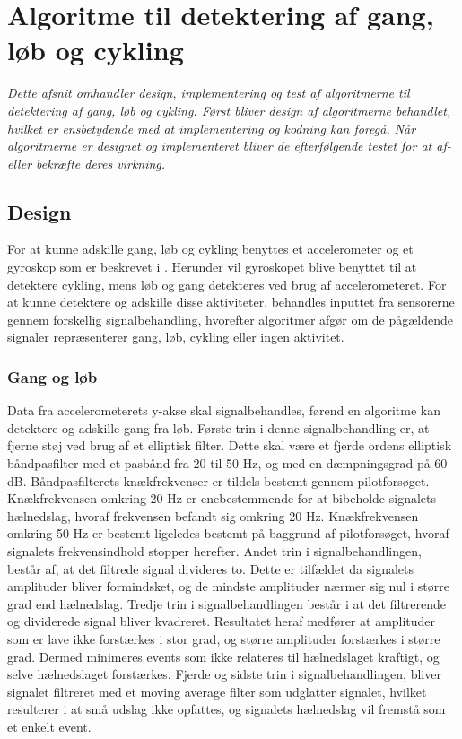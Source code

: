 \newpage
\section{Algoritme til detektering af gang, løb og cykling}
\textit{Dette afsnit omhandler design, implementering og test af algoritmerne til detektering af gang, løb og cykling. Først bliver design af algoritmerne behandlet, hvilket er ensbetydende med at implementering og kodning kan foregå. Når algoritmerne er designet og implementeret bliver de efterfølgende testet for at af- eller bekræfte deres virkning.}

\subsection{Design}
For at kunne adskille gang, løb og cykling benyttes et accelerometer og et gyroskop som er beskrevet i . Herunder vil gyroskopet blive benyttet til at detektere cykling, mens løb og gang detekteres ved brug af accelerometeret. For at kunne detektere og adskille disse aktiviteter, behandles inputtet fra sensorerne gennem forskellig signalbehandling, hvorefter algoritmer afgør om de pågældende signaler repræsenterer gang, løb, cykling eller ingen aktivitet. 


\subsubsection{Gang og løb}
Data fra accelerometerets y-akse skal signalbehandles, førend en algoritme kan detektere og adskille gang fra løb. Første trin i denne signalbehandling er, at fjerne støj ved brug af et elliptisk filter. Dette skal være et fjerde ordens elliptisk båndpasfilter med et pasbånd fra 20 til 50 Hz, og med en dæmpningsgrad på 60 dB. Båndpasfilterets knækfrekvenser er tildels bestemt gennem pilotforsøget. Knækfrekvensen omkring 20 Hz er enebestemmende for at bibeholde signalets hælnedslag, hvoraf frekvensen befandt sig omkring 20 Hz. Knækfrekvensen omkring 50 Hz er bestemt ligeledes bestemt på baggrund af pilotforsøget, hvoraf signalets frekvensindhold stopper herefter. Andet trin i signalbehandlingen, består af, at det filtrede signal divideres to. Dette er tilfældet da signalets amplituder bliver formindsket, og de mindste amplituder nærmer sig nul i større grad end hælnedslag. Tredje trin i signalbehandlingen består i at det filtrerende og dividerede signal bliver kvadreret. Resultatet heraf medfører at amplituder som er lave ikke forstærkes i stor grad, og større amplituder forstærkes i større grad. Dermed minimeres events som ikke relateres til hælnedslaget kraftigt, og selve hælnedslaget forstærkes. Fjerde og sidste trin i signalbehandlingen, bliver signalet filtreret med et moving average filter som udglatter signalet, hvilket resulterer i at små udslag ikke opfattes, og signalets hælnedslag vil fremstå som et enkelt event.

